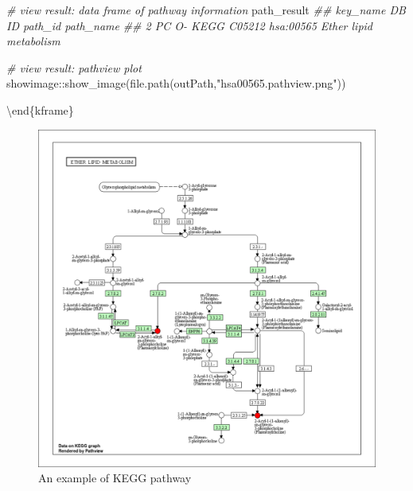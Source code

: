 \documentclass[]{article}
\newcommand{\hlstr}[1]{\textcolor[rgb]{0.251,0.627,0.251}{#1}}%
\newcommand{\hlcom}[1]{\textcolor[rgb]{0.502,0.502,0.502}{\textit{#1}}}%
\newcommand{\hlopt}[1]{\textcolor[rgb]{0,0,0}{#1}}%
\newcommand{\hlstd}[1]{\textcolor[rgb]{0.251,0.251,0.251}{#1}}%
\newcommand{\hlkwd}[1]{\textcolor[rgb]{0.878,0.439,0.125}{#1}}%
\newenvironment{Shaded}{\begin{myshaded}}{\end{myshaded}}
\newcommand{\KeywordTok}[1]{\hlkwd{#1}}
\newcommand{\StringTok}[1]{\hlstr{#1}}
\newcommand{\CommentTok}[1]{\hlcom{#1}}
\newcommand{\OperatorTok}[1]{\hlopt{#1}}
\newcommand{\NormalTok}[1]{\hlstd{#1}}
\begin{document}
\begin{Shaded}
\begin{Highlighting}[]
\CommentTok{# view result: data frame of pathway information}
\NormalTok{path_result}
\CommentTok{##   key_name   DB     ID   path_id              path_name}
\CommentTok{## 2    PC O- KEGG C05212 hsa:00565 Ether lipid metabolism}
\end{Highlighting}
\end{Shaded}

\begin{Shaded}
\begin{Highlighting}[]
\CommentTok{# view result: pathview plot}
\NormalTok{showimage}\OperatorTok{::}\KeywordTok{show_image}\NormalTok{(}\KeywordTok{file.path}\NormalTok{(outPath,}\StringTok{"hsa00565.pathview.png"}\NormalTok{))}
\end{Highlighting}
\end{Shaded}

\textbackslash end\{kframe\}

\begin{figure}

{\centering \includegraphics[width=1\linewidth,]{LipidSigR_files/figure-latex/unnamed-chunk-35-1} 

}

\caption{An example of KEGG pathway}\label{fig:unnamed-chunk-35}
\end{figure}
\end{document}
